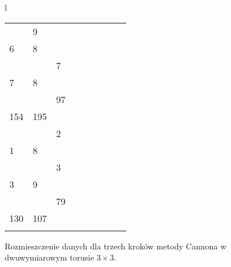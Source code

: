 \begin{przyklad}
\begin{figure}[H]
\begin{tabular}{l}
\begin{tabular}{|lll|lll|lll|}
\(\begin{pmatrix}
        0 & 9 \\
        6 & 8 \\    
\end{pmatrix}\) &
\(\begin{pmatrix}
        6 & 7 \\
        7 & 8 \\    
\end{pmatrix}\) &
\(\begin{pmatrix}
        142 & 97 \\
        154 & 195 \\    
\end{pmatrix}\) &
\(\begin{pmatrix}
        7 & 2 \\
        1 & 8 \\    
\end{pmatrix}\) &
\(\begin{pmatrix}
        2 & 3 \\
        3 & 9 \\    
\end{pmatrix}\) &
\(\begin{pmatrix}
        98 & 79 \\
        130 & 107 \\    
\end{pmatrix}\) \\
\hline
\end{tabular} 
\end{tabular}
\vspace{0.5cm}


\caption{Rozmieszczenie danych dla trzech kroków metody Cannona w dwuwymiarowym torusie \(3\times 3\).}
\label{fig:cannon_last_one}
\end{figure}




\end{przyklad}